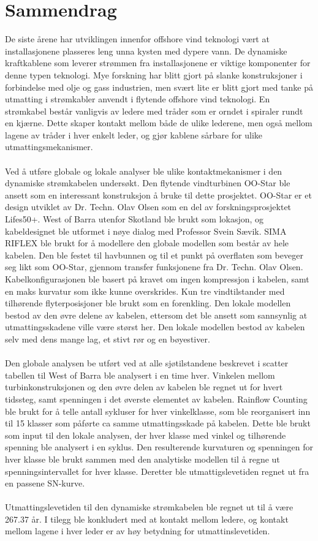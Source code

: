 \chapter*{Sammendrag}
De siste årene har utviklingen innenfor offshore vind teknologi vært at installasjonene plasseres leng unna kysten med dypere vann. De dynamiske kraftkablene som leverer strømmen fra installasjonene er viktige komponenter for denne typen teknologi. Mye forskning har blitt gjort på slanke konstruksjoner i forbindelse med olje og gass industrien, men svært lite er blitt gjort med tanke på utmatting i strømkabler anvendt i flytende offshore vind teknologi. En strømkabel består vanligvis av ledere med tråder som er orndet i spiraler rundt en kjærne. Dette skaper kontakt mellom både de ulike lederene, men også mellom lagene av tråder i hver enkelt leder, og gjør kablene sårbare for ulike utmattingsmekanismer. \\\\
Ved å utføre globale og lokale analyser ble ulike kontaktmekanismer i den dynamiske strømkabelen undersøkt. Den flytende vindturbinen OO-Star ble ansett som en interessant konstruksjon å bruke til dette prosjektet. OO-Star er et design utviklet av Dr. Techn. Olav Olsen som en del av forskningsprosjektet Lifes50+. West of Barra utenfor Skotland ble brukt som lokasjon, og kabeldesignet ble utformet i nøye dialog med Professor Svein Sævik. SIMA RIFLEX ble brukt for å modellere den globale modellen som består av hele kabelen. Den ble festet til havbunnen og til et punkt på overflaten som beveger seg likt som OO-Star, gjennom transfer funksjonene fra Dr. Techn. Olav Olsen. Kabelkonfigurasjonen ble basert på kravet om ingen kompressjon i kabelen, samt en maks kurvatur som ikke kunne overskrides. Kun tre vindtilstander med tilhørende flyterposisjoner ble brukt som en forenkling. Den lokale modellen bestod av den øvre delene av kabelen, ettersom det ble ansett som sannsynlig at utmattingsskadene ville være størst her. Den lokale modellen bestod av kabelen selv med dens mange lag, et stivt rør og en bøyestiver.\\\\
Den globale analysen be utført ved at alle sjøtilstandene beskrevet i scatter tabellen til West of Barra ble analysert i en time hver. Vinkelen mellom turbinkonstruksjonen og den øvre delen av kabelen ble regnet ut for hvert tidssteg, samt spenningen i det øverste elementet av kabelen. Rainflow Counting ble brukt for å telle antall sykluser for hver vinkelklasse, som ble reorganisert inn til 15 klasser som påførte ca samme utmattingsskade på kabelen. Dette ble brukt som input til den lokale analysen, der hver klasse med vinkel og tilhørende spenning ble analysert i en syklus. Den resulterende kurvaturen og spenningen for hver klasse ble brukt sammen med den analytiske modellen til å regne ut spenningsintervallet for hver klasse. Deretter ble utmattigslevetiden regnet ut fra en passene SN-kurve. \\\\
Utmattingslevetiden til den dynamiske strømkabelen ble regnet ut til å være 267.37 år. I tilegg ble konkludert med at kontakt mellom ledere, og kontakt mellom lagene i hver leder er av høy betydning for utmattinslevetiden. 

